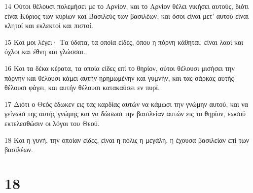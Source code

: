 \par 14 Ούτοι θέλουσι πολεμήσει με το Αρνίον, και το Αρνίον θέλει νικήσει αυτούς, διότι είναι Κύριος των κυρίων και Βασιλεύς των βασιλέων, και όσοι είναι μετ' αυτού είναι κλητοί και εκλεκτοί και πιστοί.
\par 15 Και μοι λέγει· Τα ύδατα, τα οποία είδες, όπου η πόρνη κάθηται, είναι λαοί και όχλοι και έθνη και γλώσσαι.
\par 16 Και τα δέκα κέρατα, τα οποία είδες επί το θηρίον, ούτοι θέλουσι μισήσει την πόρνην και θέλουσι κάμει αυτήν ηρημωμένην και γυμνήν, και τας σάρκας αυτής θέλουσι φάγει, και αυτήν θέλουσι κατακαύσει εν πυρί.
\par 17 Διότι ο Θεός έδωκεν εις τας καρδίας αυτών να κάμωσι την γνώμην αυτού, και να γείνωσι της αυτής γνώμης και να δώσωσι την βασιλείαν αυτών εις το θηρίον, εωσού εκτελεσθώσιν οι λόγοι του Θεού.
\par 18 Και η γυνή, την οποίαν είδες, είναι η πόλις η μεγάλη, η έχουσα βασιλείαν επί των βασιλέων.

\chapter{18}

